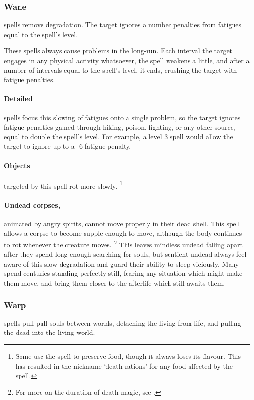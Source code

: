 \begin{multicols}{2}
\subsubsection{Wane}
spells remove degradation.
The target ignores a number penalties from \glspl{fatigue} equal to the spell's level.

These spells always cause problems in the long-run.
Each interval the target engages in any physical activity whatsoever, the spell weakens a little, and after a number of \glspl{interval} equal to the spell's level, it ends, crushing the target with \gls{fatigue} penalties.

\paragraph{Detailed}
    spells focus this slowing of \glspl{fatigue} onto a single problem, so the target ignores \gls{fatigue} penalties gained through hiking, poison, fighting, or any other source, equal to double the spell's level.
    For example, a level 3 spell would allow the target to ignore up to a -6 \gls{fatigue} penalty.

\paragraph{Objects}
    targeted by this spell rot more slowly.
    \footnote{Some use the spell to preserve food, though it always loses its flavour.
    This has resulted in the nickname `death rations' for any food affected by the spell.}

\paragraph{Undead corpses,}
    animated by angry spirits, cannot move properly in their dead shell.
    This spell allows a corpse to become supple enough to move, although the body continues to rot whenever the creature moves.%
      \footnote{For more on the duration of death magic, see .}
      This leaves mindless undead falling apart after they spend long enough searching for souls, but sentient undead always feel aware of this slow degradation and guard their ability to sleep viciously.
      Many spend centuries standing perfectly still, fearing any situation which might make them move, and bring them closer to the afterlife which still awaits them.

\subsubsection{Warp}
spells pull pull souls between worlds, detaching the living from life, and pulling the dead into the living world.


\end{multicols}
